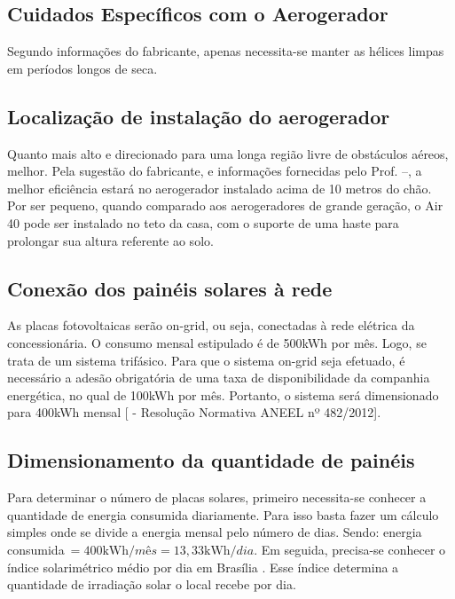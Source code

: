 \subsection{Cuidados Específicos com o Aerogerador}

	Segundo informações do fabricante, apenas necessita-se manter as hélices limpas em períodos longos de seca.

\subsection{Localização de instalação do aerogerador}

	Quanto mais alto e direcionado para uma longa região livre de obstáculos aéreos, melhor. Pela sugestão do fabricante, e informações fornecidas pelo Prof. \cite{CORMANE} --, a melhor eficiência estará no aerogerador instalado acima de 10 metros do chão. Por ser pequeno, quando comparado aos aerogeradores de grande geração, o Air 40 pode ser instalado no teto da casa, com o suporte de uma haste para prolongar sua altura referente ao solo.

\subsection{Conexão dos painéis solares à rede}

	As placas fotovoltaicas serão on-grid, ou seja, conectadas à rede elétrica da concessionária. O consumo mensal estipulado é de 500kWh por mês. Logo, se trata de um sistema trifásico. Para que o sistema on-grid seja efetuado, é necessário a adesão obrigatória de uma taxa de disponibilidade da companhia energética, no qual de 100kWh por mês. Portanto, o sistema será dimensionado para 400kWh mensal [\cite{2013Aneel} -  Resolução Normativa ANEEL nº 482/2012].

\subsection{Dimensionamento da quantidade de painéis}

	Para determinar o número de placas solares, primeiro necessita-se conhecer a quantidade de energia consumida diariamente. Para isso basta fazer um cálculo simples onde se divide a energia mensal pelo número de dias. Sendo: energia consumida$\ = 400 \si{\kilo\watt\hour}/mês = 13,33 \si{\kilo\watt\hour}/dia$. Em seguida, precisa-se conhecer o índice solarimétrico médio por dia em Brasília \cite{2000UFPE}. Esse índice determina a quantidade de irradiação solar o local recebe por dia.

